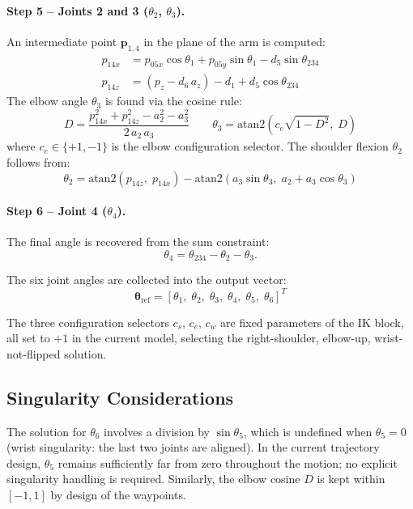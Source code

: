 \paragraph{Step 5 -- Joints 2 and 3 ($\theta_2$, $\theta_3$).}
An intermediate point $\mathbf{p}_{1,4}$ in the plane of the arm is computed:
\begin{align}
  p_{14x} &= p_{05x}\cos\theta_1 + p_{05y}\sin\theta_1 - d_5\sin\theta_{234} \\
  p_{14z} &= (p_z - d_6\,a_z) - d_1 + d_5\cos\theta_{234}
\end{align}
The elbow angle $\theta_3$ is found via the cosine rule:
\begin{equation}
  D = \frac{p_{14x}^2 + p_{14z}^2 - a_2^2 - a_3^2}{2\,a_2\,a_3}
  \qquad
  \theta_3 = \mathrm{atan2}\!\left(c_e\sqrt{1 - D^2},\;D\right)
\end{equation}
where $c_e \in \{+1,-1\}$ is the elbow configuration selector.
The shoulder flexion $\theta_2$ follows from:
\begin{equation}
  \theta_2 = \mathrm{atan2}(p_{14z},\;p_{14x}) - \mathrm{atan2}\!\left(a_3\sin\theta_3,\;a_2 + a_3\cos\theta_3\right)
\end{equation}

\paragraph{Step 6 -- Joint 4 ($\theta_4$).}
The final angle is recovered from the sum constraint:
\begin{equation}
  \theta_4 = \theta_{234} - \theta_2 - \theta_3.
\end{equation}

The six joint angles are collected into the output vector:
\begin{equation}
  \boldsymbol{\theta}_{\text{ref}} = [\theta_1,\;\theta_2,\;\theta_3,\;\theta_4,\;\theta_5,\;\theta_6]^T
\end{equation}

The three configuration selectors $c_s,\,c_e,\,c_w$ are fixed parameters of the IK block, all set to $+1$ in the current model, selecting the right-shoulder, elbow-up, wrist-not-flipped solution.

\subsection{Singularity Considerations}

The solution for $\theta_6$ involves a division by $\sin\theta_5$, which is undefined when $\theta_5 = 0$ (wrist singularity: the last two joints are aligned).
In the current trajectory design, $\theta_5$ remains sufficiently far from zero throughout the motion; no explicit singularity handling is required.
Similarly, the elbow cosine $D$ is kept within $[-1,1]$ by design of the waypoints.

